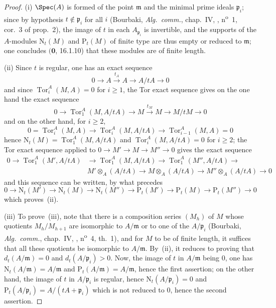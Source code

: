 \begin{proof}
(i) $\Spec(A)$ is formed of the point $\mathfrak{m}$ and the minimal prime ideals $\mathfrak{p}_i$;
since by hypothesis $t\notin\mathfrak{p}_i$ for all $i$ (Bourbaki, \emph{Alg.~comm.}, chap.~IV, , n\textsuperscript{o}~1, cor.~3 of prop.~2), the image of $t$ in each $A_{\mathfrak{p}_i}$ is invertible, and the supports of the $A$-modules $\mathrm{N}_t(M)$ and $\mathrm{P}_t(M)$ of finite type are thus empty or reduced to $\mathfrak{m}$;
one concludes $(\mathbf{0}$, 16.1.10) that these modules are of finite length.


(ii) Since $t$ is regular, one has an exact sequence
\[
  0\to A\xrightarrow{t_A} A\to A/tA\to 0
\]
and since $\operatorname{Tor}_i^A(M,A)=0$ for $i\geq 1$, the Tor exact sequence gives on the one hand the exact sequence
\[
  0\to\operatorname{Tor}_1^A(M,A/tA)\to M\xrightarrow{t_M} M\to M/tM\to 0
\]
and on the other hand, for $i\geq 2$,
\[
  0=\operatorname{Tor}_i^A(M,A)\to\operatorname{Tor}_i^A(M,A/tA)\to\operatorname{Tor}_{i-1}^A(M,A)=0
\]
hence $\mathrm{N}_t(M)=\operatorname{Tor}_1^A(M,A/tA)$ and $\operatorname{Tor}_i^A(M,A/tA)=0$ for $i\geq 2$;
the Tor exact sequence applied to $0\to M'\to M\to M''\to 0$ gives the exact sequence
\begin{align*}
  0\to\operatorname{Tor}_1^A(M',A/tA)&\to\operatorname{Tor}_1^A(M,A/tA)\to\operatorname{Tor}_1^A(M'',A/tA)\to\\
  &M'\otimes_A(A/tA)\to M\otimes_A(A/tA)\to M''\otimes_A(A/tA)\to 0
\end{align*}
and this sequence can be written, by what precedes
\[
  0\to\mathrm{N}_t(M')\to\mathrm{N}_t(M)\to\mathrm{N}_t(M'')\to\mathrm{P}_t(M')\to\mathrm{P}_t(M)\to\mathrm{P}_t(M'')\to 0
\]
which proves~(ii).

(iii) To prove~(iii), note that there is a composition series $(M_h)$ of $M$ whose quotients $M_h/M_{h+1}$ are isomorphic to $A/\mathfrak{m}$ or to one of the $A/\mathfrak{p}_i$ (Bourbaki, \emph{Alg.~comm.}, chap.~IV, , n\textsuperscript{o}~4, th.~1), and for $M$ to be of finite length, it suffices that all these quotients be isomorphic to $A/\mathfrak{m}$.
By~(ii), it reduces to proving that $d_t(A/\mathfrak{m})=0$ and $d_t(A/\mathfrak{p}_i)>0$.
Now, the image of $t$ in $A/\mathfrak{m}$ being $0$, one has $\mathrm{N}_t(A/\mathfrak{m})=A/\mathfrak{m}$ and $\mathrm{P}_t(A/\mathfrak{m})=A/\mathfrak{m}$, hence the first assertion;
on the other hand, the image of $t$ in $A/\mathfrak{p}_i$ is regular, hence $\mathrm{N}_t(A/\mathfrak{p}_i)=0$ and $\mathrm{P}_t(A/\mathfrak{p}_i)=A/(tA+\mathfrak{p}_i)$ which is not reduced to $0$, hence the second assertion.


\end{proof}
